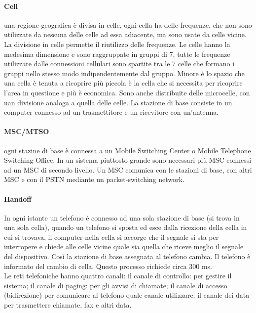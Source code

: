 \documentclass{article}
\begin{document}
\paragraph{Cell} una regione geografica è divisa in celle, ogni cella ha delle
frequenze, che non sono utilizzate da nessuna delle celle ad essa
adiacente, ma sono usate da celle vicine. La divisione in celle permette il
riutilizzo delle frequenze. Le celle hanno la medesima dimensione e sono
raggruppate in gruppi di 7, tutte le frequenze utilizzate dalle connessioni
cellulari sono spartite tra le 7 celle che formano i gruppi nello stesso modo
indipendentemente dal gruppo. Minore è lo spazio che una cella è tenuta a
ricoprire più piccola è la cella che si necessita per ricoprire l'area in
questione e più è economica. Sono anche distribuite delle microcelle, con uan
divisione analoga a quella delle celle. La stazione di base consiste in un
computer connesso ad un trasmettitore e un ricevitore con un'antenna.

\paragraph{MSC/MTSO} ogni stazine di base è connessa a un Mobile Switching Center
o Mobile Telephone Switching Office. In un sistema piuttosto grande sono necessari
più MSC connessi ad un MSC di secondo livello. Un MSC comunica con le stazioni
di base, con altri MSC e con il PSTN mediante un packet-switching network.

\paragraph{Handoff} In ogni istante un telefono è connesso ad una sola stazione di base (si trova in
una sola cella), quando un telefono si sposta ed esce dalla ricezione della
cella in cui si trovava, il computer nella cella si accorge che il segnale si
sta per interropere e chiede alle celle vicine quale sia quella che riceve
meglio il segnale del dispositivo. Così la stazione di base assegnata al
telefono cambia. Il telefono è informato del cambio di cella. Questo processo
richiede circa 300 ms.\\

Le reti telefoniche hanno quattro canali: il canale di controllo: per gestire il
sistema; il canale di paging: per gli avvisi di chiamate;
il canale di accesso (bidirezione) per comunicare al telefono quale canale
utilizzare; il canale dei data per trasmettere chiamate, fax e altri data.
\end{document}
